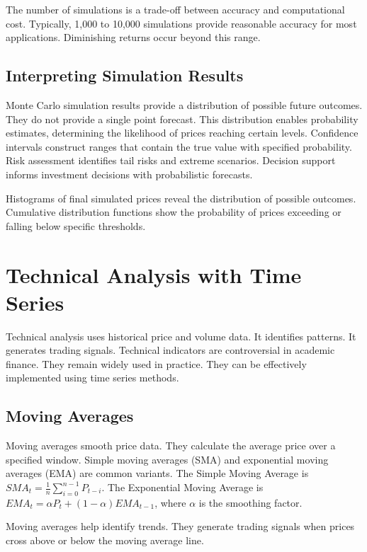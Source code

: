 The number of simulations is a trade-off between accuracy and computational cost. Typically, 1,000 to 10,000 simulations provide reasonable accuracy for most applications. Diminishing returns occur beyond this range.

\subsection{Interpreting Simulation Results}

Monte Carlo simulation results provide a distribution of possible future outcomes. They do not provide a single point forecast. This distribution enables probability estimates, determining the likelihood of prices reaching certain levels. Confidence intervals construct ranges that contain the true value with specified probability. Risk assessment identifies tail risks and extreme scenarios. Decision support informs investment decisions with probabilistic forecasts.

Histograms of final simulated prices reveal the distribution of possible outcomes. Cumulative distribution functions show the probability of prices exceeding or falling below specific thresholds.

\section{Technical Analysis with Time Series}

Technical analysis uses historical price and volume data. It identifies patterns. It generates trading signals. Technical indicators are controversial in academic finance. They remain widely used in practice. They can be effectively implemented using time series methods.

\subsection{Moving Averages}

Moving averages smooth price data. They calculate the average price over a specified window. Simple moving averages (SMA) and exponential moving averages (EMA) are common variants. The Simple Moving Average is \(SMA_t = \frac{1}{n}\sum_{i=0}^{n-1} P_{t-i}\). The Exponential Moving Average is \(EMA_t = \alpha P_t + (1-\alpha)EMA_{t-1}\), where \(\alpha\) is the smoothing factor.

Moving averages help identify trends. They generate trading signals when prices cross above or below the moving average line.

